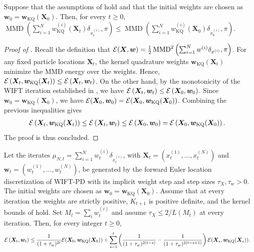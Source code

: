 \begin{lem}
\label{lem:kq-residual-control}
Suppose that the assumptions of  hold and that the initial weights are chosen as $\bm{w}_0=\bm{w}_{\mathrm{KQ}}(\bm{X}_0)$.
Then, for every $t\geq 0$, $\operatorname{MMD}
\left(
\sum_{i=1}^N
w_{\mathrm{KQ}}^{(i)} (\bm{X}_t)
\delta_{x_t^{(i)}},
\pi
\right)
\leq
\operatorname{MMD}
\left(
\sum_{i=1}^N
w_{\mathrm{KQ}}^{(i)}(\bm{X}_0)
\delta_{x_0^{(i)}},
\pi
\right)$.
\end{lem}


\begin{proof}[Proof of ]
Recall the definition that $\mathcal{E}(\bm{X},\bm{w})
=\frac12\operatorname{MMD}^2\left(\sum_{i=1}^N w^{(i)}\delta_{x^{(i)}},\pi\right)$. For any fixed particle locations $\bm{X}_t$, the kernel quadrature weights
$\bm{w}_{\mathrm{KQ}}(\bm{X}_t)$ minimize the MMD energy over the weights. Hence, $\mathcal{E}\left(
\bm{X}_t,
\bm{w}_{\mathrm{KQ}}(\bm{X}_t)
\right)
\leq
\mathcal{E}\left(
\bm{X}_t,
\bm{w}_t
\right)$. On the other hand, by the monotonicity of the WIFT iteration established in
, we have $\mathcal{E}\left(
\bm{X}_t,
\bm{w}_t
\right)
\leq
\mathcal{E}\left(
\bm{X}_0,
\bm{w}_0
\right)$. Since $\bm{w}_0=\bm{w}_{\mathrm{KQ}}(\bm{X}_0)$, we have
$ \mathcal{E}(\bm{X}_0,\bm{w}_0)
=
\mathcal{E}(\bm{X}_0,\bm{w}_{\mathrm{KQ}}(\bm{X}_0)) $.
Combining the previous inequalities gives
\begin{align}
\mathcal{E}\left(
\bm{X}_t,
\bm{w}_{\mathrm{KQ}}(\bm{X}_t)
\right) \leq
\mathcal{E}\left(
\bm{X}_t,
\bm{w}_t
\right) \leq
\mathcal{E}\left(
\bm{X}_0,
\bm{w}_0
\right) = \mathcal{E}\left(
\bm{X}_0,
\bm{w}_{\mathrm{KQ}}(\bm{X}_0)
\right).
\end{align}
The proof is thus concluded. 
\end{proof}

\begin{theorem} 
\label{thm:wift-convergence-copy}
Let the iterates $\mu_{N,t}=\sum_{i=1}^N w_t^{(i)}\delta_{x_t^{(i)}}$, with $\bm{X}_t=(x_t^{(1)},\ldots,x_t^{(N)})$ and $\bm{w}_t=(w_t^{(1)},\ldots,w_t^{(N)})$, be generated by the forward Euler location discretization of WIFT-PD with its implicit weight step and step sizes $\tau_X,\tau_w>0$. The initial weights are chosen as $\bm{w}_0=\bm{w}_{\mathrm{KQ}}(\bm{X}_0)$.
Assume that at every iteration the weights are strictly positive, $K_{t+1}$ is positive definite, and the kernel bounds of  hold. Set $M_t=\sum_iw_t^{(i)}$ and assume $\tau_X\leq2/L(M_t)$ at every iteration. Then, for every integer $t\geq0$,
\begin{align*}
\mathcal{E} \left(\bm{X}_t, \bm{w}_t\right) \leq \frac{1}{(1+\tau_w)^{2 t}} \mathcal{E}(\bm{X}_0, \bm{w}_{\mathrm{KQ}}(\bm{X}_0))  + \sum_{s=1}^t \left( \frac{1}{(1+\tau_w)^{2(t-s)}} - \frac{1}{(1+\tau_w)^{2(t-s+1)}} \right) \mathcal{E}(\bm{X}_s, \bm{w}_{\mathrm{KQ}}(\bm{X}_s)). 
\end{align*}
\end{theorem}

